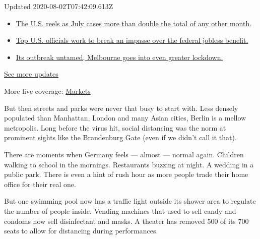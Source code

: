 Updated 2020-08-02T07:42:09.613Z

\begin{itemize}
\tightlist
\item
  \href{https://www.nytimes.com/2020/08/01/world/coronavirus-covid-19.html?action=click\&pgtype=Article\&state=default\&region=MAIN_CONTENT_1\&context=storylines_live_updates\#link-34047410}{The
  U.S. reels as July cases more than double the total of any other
  month.}
\item
  \href{https://www.nytimes.com/2020/08/01/world/coronavirus-covid-19.html?action=click\&pgtype=Article\&state=default\&region=MAIN_CONTENT_1\&context=storylines_live_updates\#link-780ec966}{Top
  U.S. officials work to break an impasse over the federal jobless
  benefit.}
\item
  \href{https://www.nytimes.com/2020/08/01/world/coronavirus-covid-19.html?action=click\&pgtype=Article\&state=default\&region=MAIN_CONTENT_1\&context=storylines_live_updates\#link-2bc8948}{Its
  outbreak untamed, Melbourne goes into even greater lockdown.}
\end{itemize}

\href{https://www.nytimes.com/2020/08/01/world/coronavirus-covid-19.html?action=click\&pgtype=Article\&state=default\&region=MAIN_CONTENT_1\&context=storylines_live_updates}{See
more updates}

More live coverage:
\href{https://www.nytimes.com/live/2020/07/31/business/stock-market-today-coronavirus?action=click\&pgtype=Article\&state=default\&region=MAIN_CONTENT_1\&context=storylines_live_updates}{Markets}

But then streets and parks were never that busy to start with. Less
densely populated than Manhattan, London and many Asian cities, Berlin
is a mellow metropolis. Long before the virus hit, social distancing was
the norm at prominent sights like the Brandenburg Gate (even if we
didn't call it that).

There are moments when Germany feels --- almost --- normal again.
Children walking to school in the mornings. Restaurants buzzing at
night. A wedding in a public park. There is even a hint of rush hour as
more people trade their home office for their real one.

But one swimming pool now has a traffic light outside its shower area to
regulate the number of people inside. Vending machines that used to sell
candy and condoms now sell disinfectant and masks. A theater has removed
500 of its 700 seats to allow for distancing during performances.

